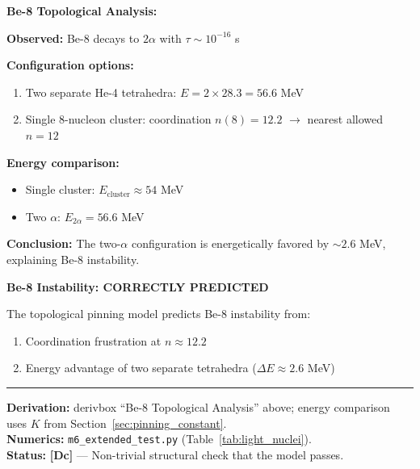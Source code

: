 \documentclass[11pt,a4paper]{article}
\newcommand{\tagDc}{\textcolor{blue!70!black}{\textbf{[Dc]}}}
\begin{document}
\begin{derivbox}
\textbf{Be-8 Topological Analysis:}

\textbf{Observed:} Be-8 decays to $2\alpha$ with $\tau \sim 10^{-16}$ s

\textbf{Configuration options:}
\begin{enumerate}
    \item Two separate He-4 tetrahedra: $E = 2 \times 28.3 = 56.6$ MeV
    \item Single 8-nucleon cluster: coordination $n(8) = 12.2$ $\to$ nearest allowed $n = 12$
\end{enumerate}

\textbf{Energy comparison:}
\begin{itemize}[nosep]
    \item Single cluster: $E_{\text{cluster}} \approx 54$ MeV
    \item Two $\alpha$: $E_{2\alpha} = 56.6$ MeV
\end{itemize}

\textbf{Conclusion:} The two-$\alpha$ configuration is energetically favored by $\sim 2.6$ MeV, explaining Be-8 instability.
\end{derivbox}

\begin{resultbox}
\textbf{Be-8 Instability: CORRECTLY PREDICTED}

The topological pinning model predicts Be-8 instability from:
\begin{enumerate}
    \item Coordination frustration at $n \approx 12.2$
    \item Energy advantage of two separate tetrahedra ($\Delta E \approx 2.6$ MeV)
\end{enumerate}

\vspace{0.3em}\hrule\vspace{0.3em}
\textbf{Derivation:} derivbox ``Be-8 Topological Analysis'' above; energy comparison uses $K$ from Section~\ref{sec:pinning_constant}.\\
\textbf{Numerics:} \texttt{m6\_extended\_test.py} (Table~\ref{tab:light_nuclei}).\\
\textbf{Status:} \tagDc{} --- Non-trivial structural check that the model passes.
\end{resultbox}
\end{document}
